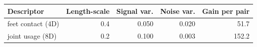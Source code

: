 \begin{tabular}{lrrrr}
\toprule
Descriptor & Length-scale & Signal var. & Noise var. & Gain per pair \\
\midrule
feet contact (4D) & 0.4 & 0.050 & 0.020 & 51.7 \\
joint usage (8D) & 0.2 & 0.100 & 0.003 & 152.2 \\
\bottomrule
\end{tabular}
